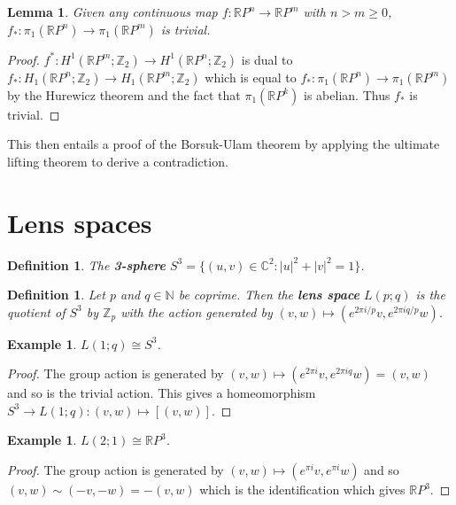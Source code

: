\documentclass{article}
\newtheorem{definition}[theorem]{Definition}
\newtheorem{lemma}[theorem]{Lemma}
\newtheorem{example}[theorem]{Example}
\begin{document}
\begin{lemma}
Given any continuous map $f\colon\mathbb{R}P^n\to \mathbb{R}P^m$ with $n>m\geq 0$, $f_*\colon\pi_1(\mathbb{R}P^n)\to \pi_1(\mathbb{R}P^m)$ is trivial.
\end{lemma}
\begin{proof}
 $f^*\colon H^1(\mathbb{R}P^m;\mathbb{Z}_2)\rightarrow H^1(\mathbb{R}P^n;\mathbb{Z}_2)$ is dual to $f_*\colon H_1(\mathbb{R}P^n;\mathbb{Z}_2)\rightarrow H_1(\mathbb{R}P^m;\mathbb{Z}_2)$ which is equal to $f_*\colon \pi_1(\mathbb{R}P^n)\rightarrow \pi_1(\mathbb{R}P^m)$ by the Hurewicz theorem and the fact that $\pi_1(\mathbb{R}P^k)$ is abelian. Thus $f_*$ is trivial.
\end{proof}

\noindent This then entails a proof of the Borsuk-Ulam theorem by applying the ultimate lifting theorem to derive a contradiction.

\section{Lens spaces}

\begin{definition}
The \textbf{3-sphere } $S^3=\{(u,v)\in\mathbb{C}^2:|u|^2+|v|^2=1\}$.
\end{definition}

\begin{definition}
Let $p$ and $q\in\mathbb{N}$ be coprime. Then the \textbf{lens space} $L(p;q)$ is the quotient of $S^3$ by $\mathbb{Z}_p$ with the action generated by $(v,w)\mapsto(e^{2\pi i/p}v,e^{2\pi iq/p}w)$.
\end{definition}

\begin{example}
$L(1;q)\cong S^3$.
\end{example}
\begin{proof}
The group action is generated by $(v,w)\mapsto(e^{2\pi i}v,e^{2\pi iq}w)=(v,w)$ and so is the trivial action. This gives a homeomorphism $S^3\to L(1;q):(v,w)\mapsto[(v,w)]$.
\end{proof}

\begin{example}
$L(2;1)\cong\mathbb{R}P^3$.
\end{example}
\begin{proof}
The group action is generated by $(v,w)\mapsto(e^{\pi i}v,e^{\pi i}w)$ and so $(v,w)\sim(-v,-w)=-(v,w)$ which is the identification which gives $\mathbb{R}P^3$.
\end{proof}
\end{document}
